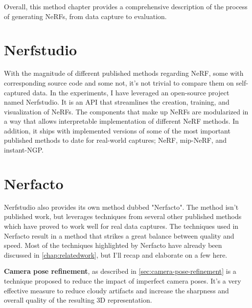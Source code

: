 Overall, this method chapter provides a comprehensive description of the process of generating NeRFs, from data capture to evaluation.

\begin{comment}
Describe the pipeline used to generate NeRFs

- Capture (video, image, polycam, etc.)
- Process (COLMAP, or direct extraction from e.g. Polycam)
    - Configuration of COLMAP
- Train (Different models)
    - Configuration of model
- Render (Real-time rendering vs. slow rendering)
- Evaluate (PSNR, SSIM, LPIPS)
- Export

- Pipelines created
    - Pipeline to test 
\end{comment}

\section{Nerfstudio}
With the magnitude of different published methods regarding NeRF, some with corresponding source code and some not, it's not trivial to compare them on self-captured data. In the experiments, I have leveraged an open-source project named Nerfstudio. It is an API that streamlines the creation, training, and visualization of NeRFs. The components that make up NeRFs are modularized in a way that allows interpretable implementation of different NeRF methods. In addition, it ships with implemented versions of some of the most important published methods to date for real-world captures; NeRF, mip-NeRF, and instant-NGP.

\section{Nerfacto}

Nerfstudio also provides its own method dubbed "Nerfacto". The method isn't published work, but leverages techniques from several other published methods which have proved to work well for real data captures. The techniques used in Nerfacto result in a method that strikes a great balance between quality and speed. Most of the techniques highlighted by Nerfacto have already been discussed in \autoref{chap:relatedwork}, but I'll recap and elaborate on a few here.

\textbf{Camera pose refinement}, as described in \autoref{sec:camera-pose-refinement} is a technique proposed to reduce the impact of imperfect camera poses. It's a very effective measure to reduce cloudy artifacts and increase the sharpness and overall quality of the resulting 3D representation.

